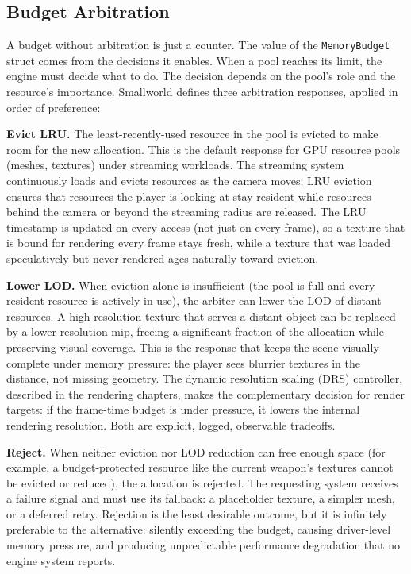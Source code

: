 \documentclass[
  11pt,
  letterpaper,
  DIV=11,
  numbers=noendperiod,
  twoside,
  open=right]{scrreprt}
\begin{document}
\subsection{Budget Arbitration}\label{budget-arbitration}

A budget without arbitration is just a counter. The value of the
\texttt{MemoryBudget} struct comes from the decisions it enables. When a
pool reaches its limit, the engine must decide what to do. The decision
depends on the pool's role and the resource's importance. Smallworld
defines three arbitration responses, applied in order of preference:

\textbf{Evict LRU.} The least-recently-used resource in the pool is
evicted to make room for the new allocation. This is the default
response for GPU resource pools (meshes, textures) under streaming
workloads. The streaming system continuously loads and evicts resources
as the camera moves; LRU eviction ensures that resources the player is
looking at stay resident while resources behind the camera or beyond the
streaming radius are released. The LRU timestamp is updated on every
access (not just on every frame), so a texture that is bound for
rendering every frame stays fresh, while a texture that was loaded
speculatively but never rendered ages naturally toward eviction.

\textbf{Lower LOD.} When eviction alone is insufficient (the pool is
full and every resident resource is actively in use), the arbiter can
lower the LOD of distant resources. A high-resolution texture that
serves a distant object can be replaced by a lower-resolution mip,
freeing a significant fraction of the allocation while preserving visual
coverage. This is the response that keeps the scene visually complete
under memory pressure: the player sees blurrier textures in the
distance, not missing geometry. The dynamic resolution scaling (DRS)
controller, described in the rendering chapters, makes the complementary
decision for render targets: if the frame-time budget is under pressure,
it lowers the internal rendering resolution. Both are explicit, logged,
observable tradeoffs.

\textbf{Reject.} When neither eviction nor LOD reduction can free enough
space (for example, a budget-protected resource like the current
weapon's textures cannot be evicted or reduced), the allocation is
rejected. The requesting system receives a failure signal and must use
its fallback: a placeholder texture, a simpler mesh, or a deferred
retry. Rejection is the least desirable outcome, but it is infinitely
preferable to the alternative: silently exceeding the budget, causing
driver-level memory pressure, and producing unpredictable performance
degradation that no engine system reports.
\end{document}
